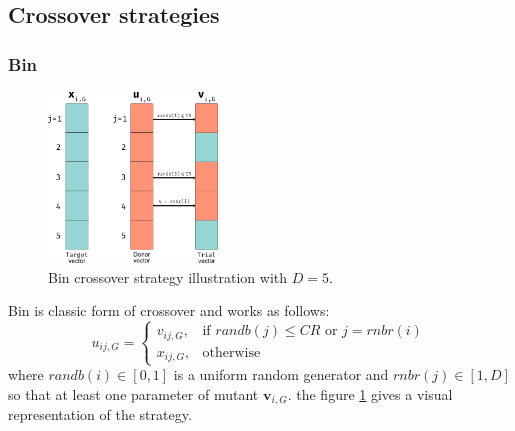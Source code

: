 \subsection{Crossover strategies}

\subsubsection{Bin}
\begin{figure}[h]
	\centering
	\includegraphics[width=0.4\textwidth]{figures/de-rand.png}
	\caption{Bin crossover strategy illustration with $D = 5$.}
	\label{fig:bin-crossover}
\end{figure}

Bin is classic form of crossover and works as follows:
\begin{equation}
	u_{ij, G} = \begin{cases}
		v_{ij, G}, &\textrm{if }\textit{randb}(j) \leq \textit{CR}\textrm{ or } j = \textit{rnbr}(i)\\
		x_{ij, G}, &\textrm{otherwise}
	\end{cases}
\end{equation}
where $\textit{randb}(i) \in [0, 1]$ is a uniform random generator and $\textit{rnbr}(j) \in [1, D]$ so that at least one parameter of mutant $\textbf{v}_{i, G}$. the figure \ref{fig:bin-crossover} gives a visual representation of the strategy.


